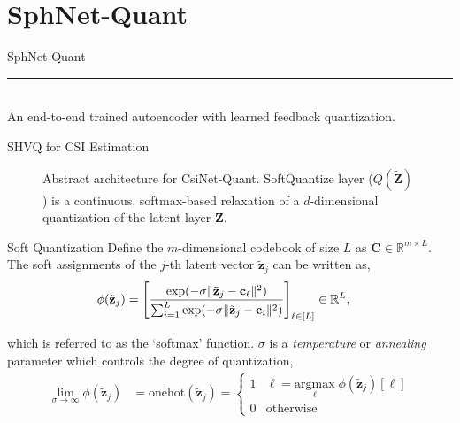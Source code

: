\documentclass{beamer}
\begin{document}
\section{SphNet-Quant}

  \begin{frame}[plain]
    \vfill
    \centering
    \begin{beamercolorbox}[sep=8pt,center,shadow=true,rounded=true]{SphNet-Quant}
      \insertsectionhead\par%
      \color{davisblue}\noindent\rule{10cm}{1pt} \\
      \footnotesize{An end-to-end trained autoencoder with learned feedback quantization.} 
    \end{beamercolorbox}
    \vfill
  \end{frame}

  \begin{frame}{SHVQ for CSI Estimation}
    \begin{figure}[!hbtp]
    \centering
    {
      \fontsize{6pt}{8pt}
      \def\svgwidth{0.8\columnwidth}
      
    }
    \caption{Abstract architecture for CsiNet-Quant. SoftQuantize layer ($Q(\tilde{\mathbf Z})$) is a continuous, softmax-based relaxation of a $d$-dimensional quantization of the latent layer $\mathbf Z$.}
    \label{fig:csinet_quant}
    \end{figure}
  \end{frame}

  \begin{frame}{Soft Quantization}
    Define the $m$-dimensional codebook of size $L$ as $\mathbf C \in \mathbb R^{m\times L}$. The soft assignments of the $j$-th latent vector $\tilde{\mathbf z}_j$ can be written as,
    \begin{align}
    \phi(\tilde{\mathbf z}_j) &= \left[\frac{\text{exp}(-\sigma \Arrowvert \tilde{\mathbf z}_j - \mathbf c_\ell\Arrowvert^2)}{\sum_{i=1}^L\text{exp}(-\sigma \Arrowvert \tilde{\mathbf z}_j - \mathbf c_i\Arrowvert^2)}\right]_{\ell\in [L]} \in \mathbb R^L, \label{eq:soft_assign}
    \end{align}

    which is referred to as the `softmax' function. $\sigma$ is a \emph{temperature} or \emph{annealing} parameter which controls the degree of quantization,
    \begin{align}
      \lim_{\sigma \to \infty} \phi(\tilde{\mathbf z}_j) &= \text{onehot}(\tilde{\mathbf z}_j) = \begin{cases} 1 & \ell = \underset{\ell}{\text{argmax}} \; \phi(\tilde{\mathbf z}_j)[\ell] \\ 0 & \text{otherwise} \end{cases}
    \end{align}
  \end{frame}
\end{document}
